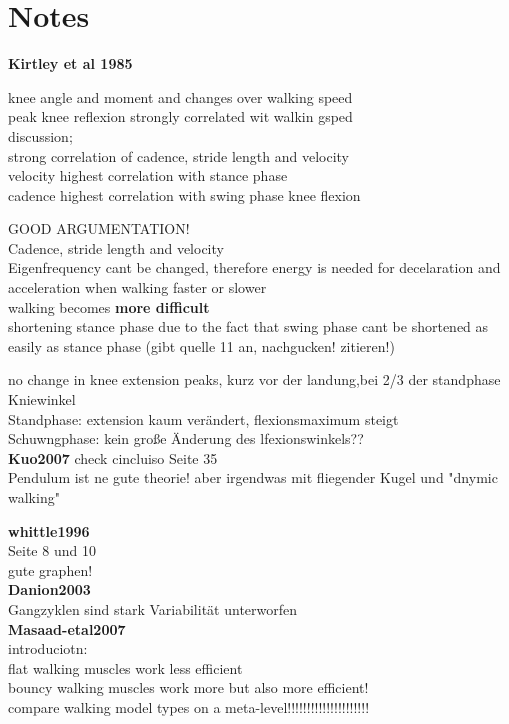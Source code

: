 \section{Notes}

\textbf{Kirtley et al 1985}

knee angle and moment and changes over walking speed\\
peak knee reflexion strongly correlated wit walkin gsped\\

discussion;\\
strong correlation of cadence, stride length and velocity\\
velocity highest correlation with stance phase\\
cadence highest correlation with swing phase knee flexion

GOOD ARGUMENTATION!\\
Cadence, stride length and velocity\\
Eigenfrequency cant be changed, therefore energy is needed for decelaration and acceleration when walking faster or slower\\
walking becomes \textbf{more difficult}\\

shortening stance phase due to the fact that swing phase cant be shortened as easily as stance phase (gibt quelle 11 an, nachgucken! zitieren!)

no change in knee extension peaks, kurz vor der landung,bei 2/3 der standphase\\

Kniewinkel\\
Standphase: extension kaum verändert, flexionsmaximum steigt\\
Schuwngphase: kein große Änderung des lfexionswinkels??\\

\textbf{Kuo2007}
check cincluiso Seite 35\\
Pendulum ist ne gute theorie! aber irgendwas mit fliegender Kugel und "dnymic walking"

\textbf{whittle1996}\\
Seite 8 und 10\\
gute graphen!\\

\textbf{Danion2003}\\
Gangzyklen sind stark Variabilität unterworfen\\

\textbf{Masaad-etal2007}\\
introduciotn:\\
flat walking muscles work less efficient\\
bouncy walking muscles work more but also more efficient!\\
compare walking model types on a meta-level!!!!!!!!!!!!!!!!!!!!!\\

